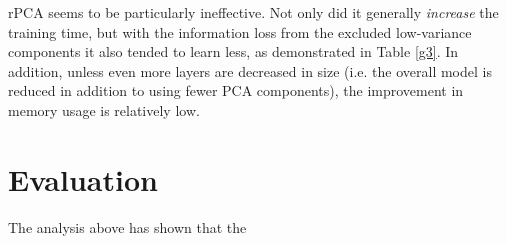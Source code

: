 \documentclass[10pt, twocolumn]{article}
\begin{document}
rPCA seems to be particularly ineffective. Not only did it generally \textit{increase} the training time, but with the information loss from the excluded low-variance components it also tended to learn less, as demonstrated in Table \ref{g3}. In addition, unless even more layers are decreased in size (i.e. the overall model is reduced in addition to using fewer PCA components), the improvement in memory usage is relatively low. 


\section{Evaluation}
The analysis above has shown that the 


\medskip
 


\end{document}
